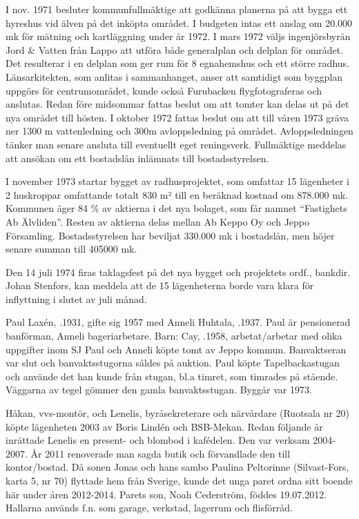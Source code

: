 I nov. 1971 besluter kommunfullmäktige att godkänna planerna på att bygga ett hyreshus vid älven på det inköpta området. I budgeten intas ett anslag om 20.000 mk för mätning och kartläggning under år 1972. I mars 1972 väljs ingenjörsbyrån Jord \& Vatten från Lappo att utföra både generalplan och delplan för området. Det resulterar i en delplan som ger rum för 8 egnahemshus och ett större radhus. Länsarkitekten, som anlitas i sammanhanget, anser att samtidigt som byggplan uppgörs för centrumområdet, kunde också Furubacken flygfotograferas och anslutas. Redan före midsommar fattas beslut om att tomter kan delas ut på det nya området till hösten. I oktober 1972 fattas beslut om att till våren 1973 gräva ner 1300 m vattenledning och 300m avloppsledning på området. Avloppsledningen tänker man senare ansluta till eventuellt eget reningsverk. Fullmäktige meddelas att ansökan om ett bostadslån inlämnats till bostadsstyrelsen.

I november 1973 startar bygget av radhusprojektet, som omfattar 15 lägenheter i 2 huskroppar omfattande totalt 830 m² till en beräknad kostnad om 878.000 mk. Kommunen äger 84 \% av aktierna i det nya bolaget, som får namnet ``Fastighets Ab Älvliden''. Resten av aktierna delas mellan Ab Keppo Oy och Jeppo Församling. Bostadsstyrelsen har beviljat 330.000 mk i bostadslån, men höjer senare summan till 405000 mk.

Den 14 juli 1974 firas taklagsfest på det nya bygget och projektets ordf., bankdir. Johan Stenfors, kan meddela att de 15 lägenheterna borde vara klara för inflyttning i slutet av juli månad.




Paul Laxén, .1931, gifte sig 1957 med Anneli Huhtala, .1937. Paul är pensionerad banförman, Anneli bageriarbetare.
Barn: Cay, .1958, arbetat/arbetar med olika uppgifter inom SJ
Paul och Anneli köpte tomt av Jeppo kommun. Banvaktseran var slut och banvaktsstugorna såldes på auktion. Paul köpte Tapelbackastugan och använde det han kunde från stugan, bl.a timret, som timrades på stående. Väggarna av tegel gömmer den gamla banvaktsstugan. Byggår var 1973.




Håkan, vvs-montör, och Lenelis, byråsekreterare och närvårdare (Ruotsala nr 20) köpte lägenheten 2003 av Boris Lindén och BSB-Mekan. Redan följande år inrättade Lenelis en present- och blombod 	i kafédelen. Den var verksam 2004-2007. År 2011 renoverade man sagda butik och förvandlade den till	kontor/bostad. Då sonen Jonas och hans sambo Paulina Peltorinne	(Silvast-Fors, karta 5, nr 70) flyttade hem från Sverige, kunde det unga paret ordna sitt boende här under åren 2012-2014. Parets son, Noah Cederström, föddes 19.07.2012.
Hallarna används f.n. som garage, verkstad, lagerrum och flisförråd.


